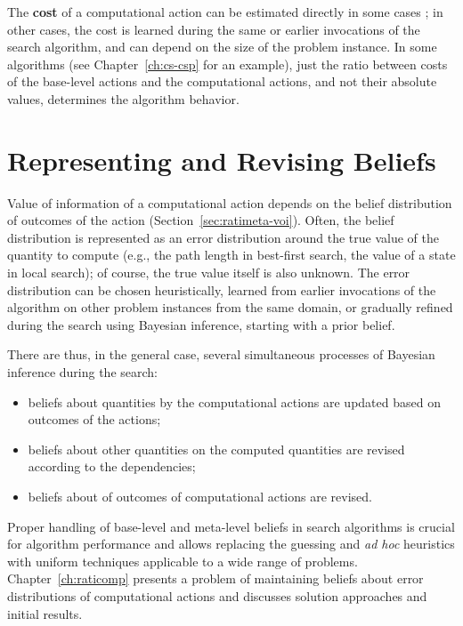 The {\bf cost} of a computational action can be estimated directly in
some cases \cite{Russell.right}; in other cases, the cost is learned
during the same or earlier invocations of the search algorithm, and
can depend on the size of the problem instance. In some algorithms
(see Chapter~\ref{ch:cs-csp} for an example), just the ratio between
costs of the base-level actions and the computational actions, and not
their absolute values, determines the algorithm behavior.

\section{Representing and Revising Beliefs}

Value of information of a computational action depends on the belief
distribution of outcomes of the action
(Section~\ref{sec:ratimeta-voi}).  Often, the belief distribution is
represented as an error distribution around the true value of the
quantity to compute (e.g., the path length in best-first search, the
value of a state in local search); of course, the true value itself is
also unknown.  The error distribution can be chosen heuristically,
learned from earlier invocations of the algorithm on other problem
instances from the same domain, or gradually refined during the search
using Bayesian inference, starting with a prior belief. 

There are thus, in the general case, several simultaneous processes of
Bayesian inference during the search:
\begin{itemize}
\item beliefs about quantities  by the computational actions
are updated based on outcomes of the actions;
\item beliefs about other quantities  on the computed
quantities are revised according to the dependencies;
\item beliefs about  of  outcomes of computational
actions are revised.
\end{itemize}
Proper handling of base-level and meta-level beliefs in search
algorithms is crucial for algorithm performance and allows replacing
the guessing and {\it ad hoc} heuristics with uniform techniques
applicable to a wide range of
problems. Chapter~\ref{ch:raticomp} presents a
problem of maintaining beliefs about error distributions of
computational actions and discusses solution approaches and initial
results.

